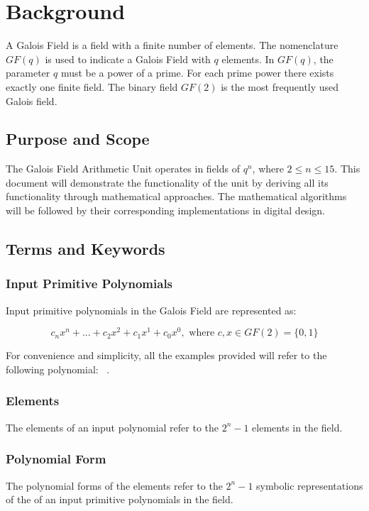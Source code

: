 \section{Background} A Galois Field is a field with a finite number of
elements. The nomenclature $GF(q)$ is used to indicate a Galois Field with $q$
elements. In $GF(q)$, the parameter $q$ must be a power of a prime. For each
prime power there exists exactly one finite field. The binary field $GF(2)$ is
the most frequently used Galois field. \cite{wolfdef}

    \subsection{Purpose and Scope} The Galois Field Arithmetic Unit
    operates in fields of $q^n$, where $2 \leq n \leq 15$. This document
    will demonstrate the functionality of the unit by deriving all its
    functionality through mathematical approaches. The mathematical
    algorithms will be followed by their corresponding implementations in
    digital design.

    \subsection{Terms and Keywords}

        \subsubsection{Input Primitive Polynomials} Input primitive
        polynomials in the Galois Field are represented as:

        \[ c_{n}x^{n}+\ldots+c_{2}x^{2}+c_{1}x^{1}+c_{0}x^{0}, \text{ where } c,x \in GF(2)=\{0,1\} \]

        For convenience and simplicity, all the examples provided will
        refer to the following polynomial: \examplepoly~.

        \subsubsection{Elements} The elements of an input polynomial refer
        to the $2^{n}-1$ elements in the field.

        \subsubsection{Polynomial Form} The polynomial forms of the
        elements refer to the $2^{n}-1$ symbolic representations of the of
        an input primitive polynomials in the field.

